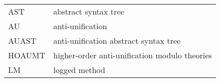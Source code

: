\begin{tabular}{ll}
AST & abstract syntax tree\\
AU & anti-unification \\
AUAST & anti-unification abstract syntax tree\\
HOAUMT & higher-order anti-unification modulo theories\\
LM & logged method\\
\end{tabular}
